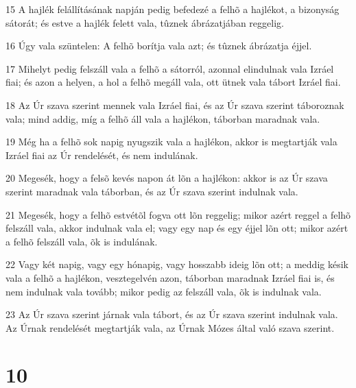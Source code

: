 \par 15 A hajlék felállításának napján pedig befedezé a felhõ a hajlékot, a bizonyság sátorát; és estve a hajlék felett vala, tûznek ábrázatjában reggelig.
\par 16 Úgy vala szüntelen: A felhõ borítja vala azt; és tûznek ábrázatja éjjel.
\par 17 Mihelyt pedig felszáll vala a felhõ a sátorról, azonnal elindulnak vala Izráel fiai; és azon a helyen, a hol a felhõ megáll vala, ott ütnek vala tábort Izráel fiai.
\par 18 Az Úr szava szerint mennek vala Izráel fiai, és az Úr szava szerint táboroznak vala; mind addig, míg a felhõ áll vala a hajlékon, táborban maradnak vala.
\par 19 Még ha a felhõ sok napig nyugszik vala a hajlékon, akkor is megtartják vala Izráel fiai az Úr rendelését, és nem indulának.
\par 20 Megesék, hogy a felsõ kevés napon át lõn a hajlékon: akkor is az Úr szava szerint maradnak vala táborban, és az Úr szava szerint indulnak vala.
\par 21 Megesék, hogy a felhõ estvétõl fogva ott lõn reggelig; mikor azért reggel a felhõ felszáll vala, akkor indulnak vala el; vagy egy nap és egy éjjel lõn ott; mikor azért a felhõ felszáll vala, õk is indulának.
\par 22 Vagy két napig, vagy egy hónapig, vagy hosszabb ideig lõn ott; a meddig késik vala a felhõ a hajlékon, vesztegelvén azon, táborban maradnak Izráel fiai is, és nem indulnak vala tovább; mikor pedig az felszáll vala, õk is indulnak vala.
\par 23 Az Úr szava szerint járnak vala tábort, és az Úr szava szerint indulnak vala. Az Úrnak rendelését megtartják vala, az Úrnak Mózes által való szava szerint.

\chapter{10}

